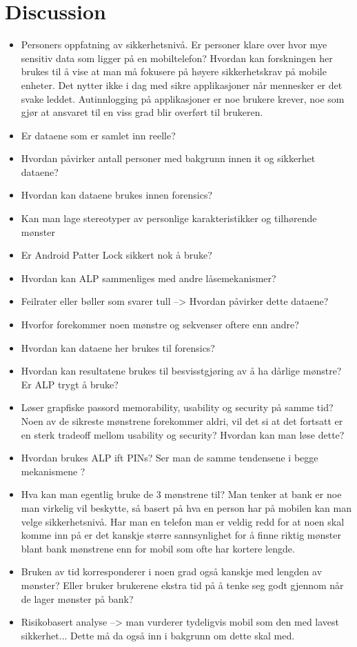 \chapter{Discussion}\label{chap:discussion}

	\begin{itemize}
		\item Personers oppfatning av sikkerhetsnivå. Er personer klare over hvor mye sensitiv data som ligger på en mobiltelefon? Hvordan kan forskningen her brukes til å vise at man må fokusere på høyere sikkerhetskrav på mobile enheter. Det nytter ikke i dag med sikre applikasjoner når mennesker er det svake leddet. Autinnlogging på applikasjoner er noe brukere krever, noe som gjør at ansvaret til en viss grad blir overført til brukeren.
		\item Er dataene som er samlet inn reelle? 
		\item Hvordan påvirker antall personer med bakgrunn innen it og sikkerhet dataene?
		\item Hvordan kan dataene brukes innen forensics?
		\item Kan man lage stereotyper av personlige karakteristikker og tilhørende mønster
		\item Er Android Patter Lock sikkert nok å bruke?
		\item Hvordan kan ALP sammenliges med andre låsemekanismer?
		\item Feilrater eller bøller som svarer tull --> Hvordan påvirker dette dataene?
		\item Hvorfor forekommer noen mønstre og sekvenser oftere enn andre?
		\item Hvordan kan dataene her brukes til forensics?
		\item Hvordan kan resultatene brukes til besvisstgjøring av å ha dårlige mønstre? Er ALP trygt å bruke?
		\item Løser grapfiske passord memorability, usability og security på samme tid? Noen av de sikreste mønstrene forekommer aldri, vil det si at det fortsatt er en sterk tradeoff mellom usability og security? Hvordan kan man løse dette?
		\item Hvordan brukes ALP ift PINs? Ser man de samme tendensene i begge mekanismene ?
		\item Hva kan man egentlig bruke de 3 mønstrene til? Man tenker at bank er noe man virkelig vil beskytte, så basert på hva en person har på mobilen kan man velge sikkerhetsnivå. Har man en telefon man er veldig redd for at noen skal komme inn på er det kanskje større sannsynlighet for å finne riktig mønster blant bank mønstrene enn for mobil som ofte har kortere lengde. 
		\item Bruken av tid korresponderer i noen grad også kanskje med lengden av mønster? Eller bruker brukerene ekstra tid på å tenke seg godt gjennom når de lager mønster på bank?
		\item Risikobasert analyse --> man vurderer tydeligvis mobil som den med lavest sikkerhet... Dette må da også inn i bakgrunn om dette skal med.
	\end{itemize}


